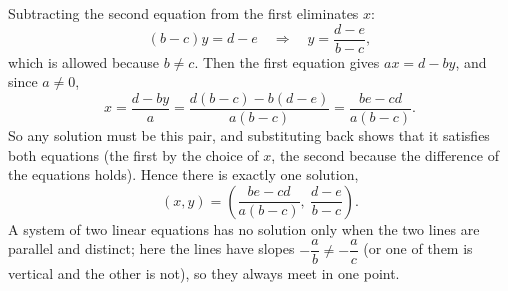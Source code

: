 Subtracting the second equation from the first eliminates $x$:
\[
(b-c)y=d-e\quad\Longrightarrow\quad y=\dfrac{d-e}{b-c},
\]
which is allowed because $b\ne c$. Then the first equation gives $ax=d-by$, and since $a\ne0$,
\[
x=\dfrac{d-by}{a}=\dfrac{d(b-c)-b(d-e)}{a(b-c)}=\dfrac{be-cd}{a(b-c)} .
\]
So any solution must be this pair, and substituting back shows that it satisfies both equations (the first by the choice of $x$, the second because the difference of the equations holds). Hence there is exactly one solution,
\[
\boxed{(x,y)=\left(\dfrac{be-cd}{a(b-c)},\ \dfrac{d-e}{b-c}\right)}.
\]
A system of two linear equations has no solution only when the two lines are parallel and distinct; here the lines have slopes $-\dfrac {a}{b}\ne-\dfrac {a}{c}$ (or one of them is vertical and the other is not), so they always meet in one point.
